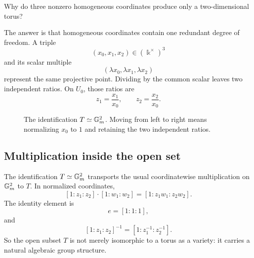 \begin{guidingquestion}
Why do three nonzero homogeneous coordinates produce only a
two-dimensional torus?
\end{guidingquestion}

The answer is that homogeneous coordinates contain one redundant
degree of freedom. A triple
\[
(x_0,x_1,x_2)\in(\Bbbk^\times)^3
\]
and its scalar multiple
\[
(\lambda x_0,\lambda x_1,\lambda x_2)
\]
represent the same projective point. Dividing by the common scalar
leaves two independent ratios. On \(U_0\), those ratios are
\[
z_1=\frac{x_1}{x_0},
\qquad
z_2=\frac{x_2}{x_0}.
\]

\begin{figure}[ht]
\centering
{}
\caption{The identification \(T\simeq\mathbb{G}_{m}^2\). Moving from left to
right means normalizing \(x_0\) to \(1\) and retaining the two
independent ratios.}
\label{fig:p2-torus-identification}
\end{figure}

\subsection{Multiplication inside the open set}

The identification \(T\simeq\mathbb{G}_{m}^2\) transports the usual
coordinatewise multiplication on \(\mathbb{G}_{m}^2\) to \(T\). In normalized
coordinates,
\[
[1:z_1:z_2]\cdot[1:w_1:w_2]
=
[1:z_1w_1:z_2w_2].
\]
The identity element is
\[
e=[1:1:1],
\]
and
\[
[1:z_1:z_2]^{-1}
=
[1:z_1^{-1}:z_2^{-1}].
\]
So the open subset \(T\) is not merely isomorphic to a torus as a
variety: it carries a natural algebraic group structure.

